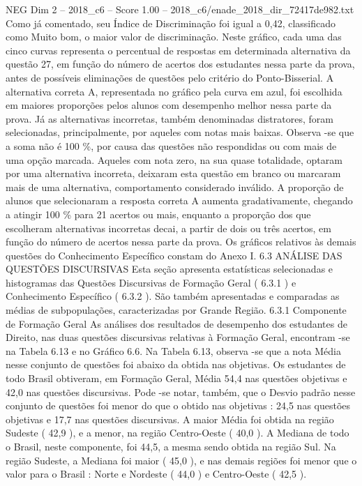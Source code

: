 \begin{textsample}{NEG Dim 2 – 2018\_c6 – Score 1.00 – 2018\_c6/enade\_2018\_dir\_72417de982.txt}
Como já comentado, seu Índice de Discriminação foi igual a 0,42, classificado como Muito bom, o maior valor de discriminação.
Neste gráfico, cada uma das cinco curvas representa o percentual de respostas em determinada alternativa da questão 27, em função do número de acertos dos estudantes nessa parte da prova, antes de possíveis eliminações de questões pelo critério do Ponto-Bisserial.
A alternativa correta A, representada no gráfico pela curva em azul, foi escolhida em maiores proporções pelos alunos com desempenho melhor nessa parte da prova.
Já as alternativas incorretas, também denominadas distratores, foram selecionadas, principalmente, por aqueles com notas mais baixas.
Observa -se que a soma não é 100 \%, por causa das questões não respondidas ou com mais de uma opção marcada.
Aqueles com nota zero, na sua quase totalidade, optaram por uma alternativa incorreta, deixaram esta questão em branco ou marcaram mais de uma alternativa, comportamento considerado inválido.
A proporção de alunos que selecionaram a resposta correta A aumenta gradativamente, chegando a atingir 100 \% para 21 acertos ou mais, enquanto a proporção dos que escolheram alternativas incorretas decai, a partir de dois ou três acertos, em função do número de acertos nessa parte da prova.
Os gráficos relativos às demais questões do Conhecimento Específico constam do Anexo I. 6.3 ANÁLISE DAS QUESTÕES DISCURSIVAS Esta seção apresenta estatísticas selecionadas e histogramas das Questões Discursivas de Formação Geral ( 6.3.1 ) e Conhecimento Específico ( 6.3.2 ).
São também apresentadas e comparadas as médias de subpopulações, caracterizadas por Grande Região. 6.3.1 Componente de Formação Geral As análises dos resultados de desempenho dos estudantes de Direito, nas duas questões discursivas relativas à Formação Geral, encontram -se na Tabela 6.13 e no Gráfico 6.6.
Na Tabela 6.13, observa -se que a nota Média nesse conjunto de questões foi abaixo da obtida nas objetivas.
Os estudantes de todo Brasil obtiveram, em Formação Geral, Média 54,4 nas questões objetivas e 42,0 nas questões discursivas.
Pode -se notar, também, que o Desvio padrão nesse conjunto de questões foi menor do que o obtido nas objetivas : 24,5 nas questões objetivas e 17,7 nas questões discursivas.
A maior Média foi obtida na região Sudeste ( 42,9 ), e a menor, na região Centro-Oeste ( 40,0 ).
A Mediana de todo o Brasil, neste componente, foi 44,5, a mesma sendo obtida na região Sul.
Na região Sudeste, a Mediana foi maior ( 45,0 ), e nas demais regiões foi menor que o valor para o Brasil : Norte e Nordeste ( 44,0 ) e Centro-Oeste ( 42,5 ).

\end{textsample}
